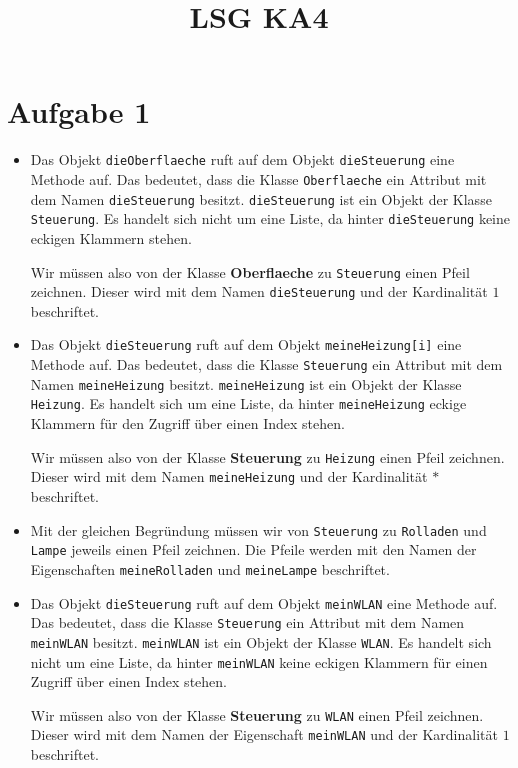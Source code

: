\documentclass[a4paper]{scrartcl}
\date{}
\title{LSG KA4}
\begin{document}
\section*{Aufgabe 1}

\begin{itemize}
\item Das Objekt \texttt{dieOberflaeche} ruft auf dem Objekt \texttt{dieSteuerung} eine Methode auf. Das bedeutet, dass die Klasse \texttt{Oberflaeche} ein Attribut mit dem Namen \texttt{dieSteuerung} besitzt. \texttt{dieSteuerung} ist ein Objekt der Klasse \texttt{Steuerung}. Es handelt sich nicht um eine Liste, da hinter \texttt{dieSteuerung} keine eckigen Klammern stehen.

Wir müssen also von der Klasse \textbf{Oberflaeche} zu \texttt{Steuerung} einen Pfeil zeichnen. Dieser wird mit dem Namen \texttt{dieSteuerung} und der Kardinalität $1$ beschriftet.

\item Das Objekt \texttt{dieSteuerung} ruft auf dem Objekt \texttt{meineHeizung[i]} eine Methode auf. Das bedeutet, dass die Klasse \texttt{Steuerung} ein Attribut mit dem Namen \texttt{meineHeizung} besitzt. \texttt{meineHeizung} ist ein Objekt der Klasse \texttt{Heizung}. Es handelt sich um eine Liste, da hinter \texttt{meineHeizung} eckige Klammern für den Zugriff über einen Index stehen.

Wir müssen also von der Klasse \textbf{Steuerung} zu \texttt{Heizung} einen Pfeil zeichnen. Dieser wird mit dem Namen \texttt{meineHeizung} und der Kardinalität $*$ beschriftet.

\item Mit der gleichen Begründung müssen wir von \texttt{Steuerung} zu \texttt{Rolladen} und \texttt{Lampe} jeweils einen Pfeil zeichnen. Die Pfeile werden mit den Namen der Eigenschaften \texttt{meineRolladen} und \texttt{meineLampe} beschriftet.

\item Das Objekt \texttt{dieSteuerung} ruft auf dem Objekt \texttt{meinWLAN} eine Methode auf. Das bedeutet, dass die Klasse \texttt{Steuerung} ein Attribut mit dem Namen \texttt{meinWLAN} besitzt. \texttt{meinWLAN} ist ein Objekt der Klasse \texttt{WLAN}. Es handelt sich nicht um eine Liste, da hinter \texttt{meinWLAN} keine eckigen Klammern für einen Zugriff über einen Index stehen.

Wir müssen also von der Klasse \textbf{Steuerung} zu \texttt{WLAN} einen Pfeil zeichnen. Dieser wird mit dem Namen der Eigenschaft \texttt{meinWLAN} und der Kardinalität $1$ beschriftet.
\end{itemize}
\end{document}
